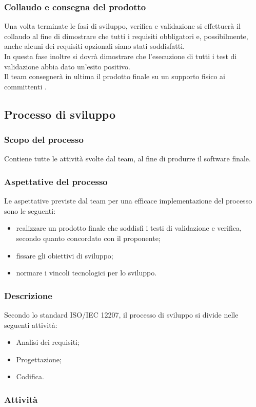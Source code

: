 \subsubsection{Collaudo e consegna del prodotto}
Una volta terminate le fasi di sviluppo, verifica e validazione si effettuerà il collaudo al fine di dimostrare che tutti i requisiti obbligatori e, possibilmente, anche alcuni dei requisiti opzionali siano stati soddisfatti. 
\\In questa fase inoltre si dovrà dimostrare che l'esecuzione di tutti i test di validazione abbia dato un'esito positivo.
\\Il team consegnerà in ultima il prodotto finale su un supporto fisico ai committenti \committenti.

\subsection{Processo di sviluppo}
\subsubsection{Scopo del processo}
Contiene tutte le attività svolte dal team, al fine di produrre il software finale.
\subsubsection{Aspettative del processo}
Le aspettative previste dal team per una efficace implementazione del processo sono le seguenti:
\begin{itemize}
	\item realizzare un prodotto finale che soddisfi i testi di validazione e verifica, secondo quanto concordato con il proponente;
	\item fissare gli obiettivi di sviluppo;
	\item normare i vincoli tecnologici per lo sviluppo.
\end{itemize}
\subsubsection{Descrizione}
Secondo lo standard ISO/IEC 12207, il processo di sviluppo si divide nelle seguenti attività:
\begin{itemize}
	\item Analisi dei requisiti;
	\item Progettazione;
	\item Codifica.
\end{itemize}
\subsubsection{Attività}
